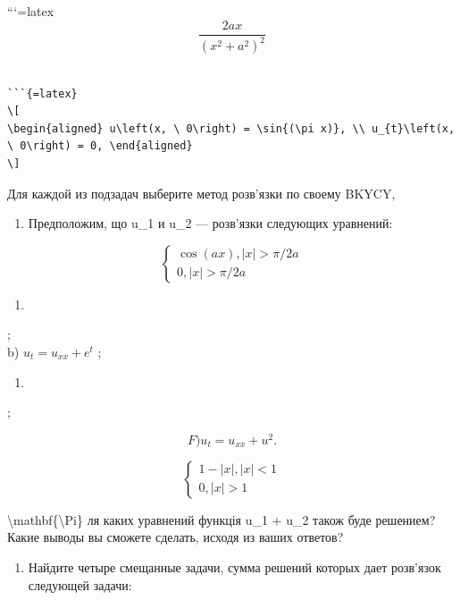 \documentclass[
]{article}
\providecommand{\tightlist}{%
  \setlength{\itemsep}{0pt}\setlength{\parskip}{0pt}}
\begin{document}
```{=latex}
\[
\frac{2ax}{(x^2+a^2)^2}
\]

\begin{verbatim}

```{=latex}
\[
\begin{aligned} u\left(x, \ 0\right) = \sin{(\pi x)}, \\ u_{t}\left(x, \ 0\right) = 0, \end{aligned}
\]
\end{verbatim}

Для каждой из подзадач выберите метод розв'язки по своему BKYCY,

\begin{enumerate}
\def\labelenumi{\arabic{enumi}.}
\setcounter{enumi}{2}
\tightlist
\item
  Предположим, що u\_1 и u\_2 --- розв'язки следующих уравнений:
\end{enumerate}

\[
\begin{cases} \cos(ax), |x| > \pi/2a \\ 0, |x| > \pi/2a \end{cases}
\]

\begin{enumerate}
\def\labelenumi{\alph{enumi})}
\tightlist
\item
\end{enumerate}

;\\
b) \(u_t = u_{xx} + e^t\) ;

\begin{enumerate}
\def\labelenumi{\Alph{enumi})}
\setcounter{enumi}{1}
\tightlist
\item
\end{enumerate}

;

\[
F)  u_t = u_{xx} + u^2  .
\]

\[
\begin{cases} 1-|x|, |x| < 1 \\ 0, |x| > 1 \end{cases}
\]

\textbackslash mathbf\{\textbackslash Pi\} ля каких уравнений функція
u\_1 + u\_2 також буде решением? Какие выводы вы сможете сделать, исходя
из ваших ответов?

\begin{enumerate}
\def\labelenumi{\arabic{enumi}.}
\setcounter{enumi}{3}
\tightlist
\item
  Найдите четыре смещанные задачи, сумма решений которых дает розв'язок
  следующей задачи:
\end{enumerate}
\end{document}
